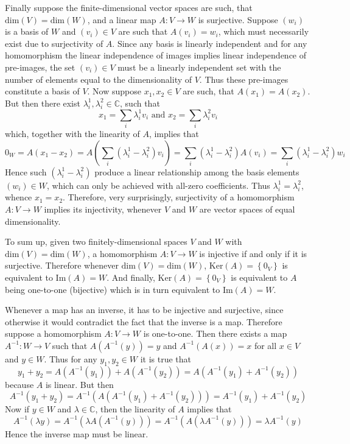 \documentclass[a4paper]{article}
\newcommand{\obj}[1]{\ensuremath{\left\{ #1 \right\}}}
\newcommand{\brac}[1]{\ensuremath{\left( #1 \right)}}
\newcommand{\Dim}[1]{\ensuremath{\text{dim}\brac{ #1 }}}
\newcommand{\Ker}[1]{\ensuremath{\text{Ker}\brac{ #1 }}}
\newcommand{\im}[1]{\ensuremath{\text{Im}\brac{ #1 }}}
\begin{document}
Finally suppose the finite-dimensional vector spaces are such, that $\Dim{V}=\Dim{W}$, and a linear map $A:V\to W$ is surjective. Suppose $\brac{w_i}$ is a basis of $W$ and $\brac{v_i}\in V$ are such that $A\brac{v_i}=w_i$, which must necessarily exist due to surjectivity of $A$. Since any basis is linearly independent and for any homomorphism the linear independence of images implies linear independence of pre-images, the set $\brac{v_i}\in V$ must be a linearly independent set with the number of elements equal to the dimensionality of $V$. Thus these pre-images constitute a basis of $V$. Now suppose $x_1, x_2 \in V$ are such, that $A\brac{x_1}=A\brac{x_2}$. But then there exist $\lambda_i^1, \lambda_i^2 \in \mathbb{C}$, such that\[x_1 = \sum_i \lambda_i^1 v_i \text{ and } x_2 = \sum_i \lambda_i^2 v_i \] which, together with the linearity of $A$, implies that \[0_W = A\brac{x_1-x_2} = A\brac{\sum_i \brac{\lambda_i^1 - \lambda_i^2} v_i} = \sum_i \brac{\lambda_i^1 - \lambda_i^2} A\brac{v_i} = \sum_i \brac{\lambda_i^1 - \lambda_i^2} w_i\] Hence such $\brac{\lambda_i^1 - \lambda_i^2}$ produce a linear relationship among the basis elements $\brac{w_i}\in W$, which can only be achieved with all-zero coefficients. Thus $\lambda_i^1 = \lambda_i^2$, whence $x_1 = x_2$. Therefore, very surprisingly, surjectivity of a homomorphism $A:V\to W$ implies its injectivity, whenever $V$ and $W$ are vector spaces of equal dimensionality.

To sum up, given two finitely-dimensional spaces $V$ and $W$ with $\Dim{V}=\Dim{W}$, a homomorphism $A:V\to W$ is injective if and only if it is surjective. Therefore whenever $\Dim{V}=\Dim{W}$, $\Ker{A} = \obj{0_V}$ is equivalent to $\im{A} = W$. And finally, $\Ker{A} = \obj{0_V}$ is equivalent to $A$ being one-to-one (bijective) which is in turn equivalent to $\im{A} = W$.

Whenever a map has an inverse, it has to be injective and surjective, since otherwise it would contradict the fact that the inverse is a map. Therefore suppose a homomorphism $A:V\to W$ is one-to-one. Then there exists a map $A^{-1}:W\to V$ such that $A\brac{A^{-1}\brac{y}}=y$ and $A^{-1}\brac{A\brac{x}}=x$ for all $x\in V$ and $y\in W$. Thus for any $y_1, y_2\in W$ it is true that \[y_1 + y_2 = A\brac{A^{-1}\brac{y_1}} + A\brac{A^{-1}\brac{y_2}} = A\brac{A^{-1}\brac{y_1} + A^{-1}\brac{y_2}}\] because $A$ is linear. But then \[ A^{-1}\brac{y_1 + y_2} = A^{-1}\brac{A\brac{A^{-1}\brac{y_1} + A^{-1}\brac{y_2}}} = A^{-1}\brac{y_1} + A^{-1}\brac{y_2}\] Now if $y\in W$ and $\lambda \in \mathbb{C}$, then the linearity of $A$ implies that \[A^{-1}\brac{\lambda y} = A^{-1}\brac{\lambda A\brac{A^{-1}\brac{y}}} = A^{-1}\brac{A\brac{\lambda A^{-1}\brac{y}}} = \lambda A^{-1}\brac{y}\] Hence the inverse map must be linear.
\end{document}
